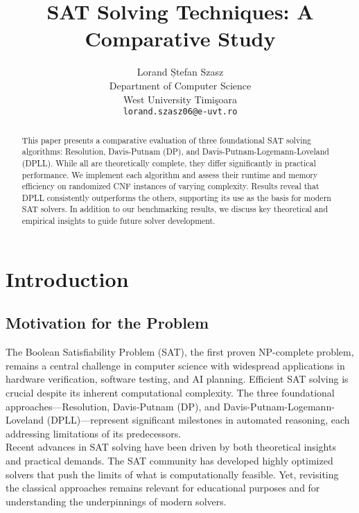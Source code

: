 \documentclass[11pt]{article}
\title{SAT Solving Techniques: A Comparative Study}
\author{Lorand Ștefan Szasz \\ Department of Computer Science \\ West University Timi\c{s}oara \\ \texttt{lorand.szasz06@e-uvt.ro}}
\date{}
\begin{document}
\maketitle

\begin{abstract}
This paper presents a comparative evaluation of three foundational SAT solving algorithms: Resolution, Davis-Putnam (DP), and Davis-Putnam-Logemann-Loveland (DPLL). While all are theoretically complete, they differ significantly in practical performance. We implement each algorithm and assess their runtime and memory efficiency on randomized CNF instances of varying complexity. Results reveal that DPLL consistently outperforms the others, supporting its use as the basis for modern SAT solvers. In addition to our benchmarking results, we discuss key theoretical and empirical insights to guide future solver development.
\end{abstract}

\newpage
\tableofcontents

\newpage
\section{Introduction}

\subsection*{Motivation for the Problem}
\hspace*{2em}
The Boolean Satisfiability Problem (SAT), the first proven NP-complete problem, remains a central challenge in computer science with widespread applications in hardware verification, software testing, and AI planning. Efficient SAT solving is crucial despite its inherent computational complexity. The three foundational approaches---Resolution, Davis-Putnam (DP), and Davis-Putnam-Logemann-Loveland (DPLL)---represent significant milestones in automated reasoning, each addressing limitations of its predecessors.\\
\hspace*{2em}
Recent advances in SAT solving have been driven by both theoretical insights and practical demands. The SAT community has developed highly optimized solvers that push the limits of what is computationally feasible. Yet, revisiting the classical approaches remains relevant for educational purposes and for understanding the underpinnings of modern solvers.
\end{document}
